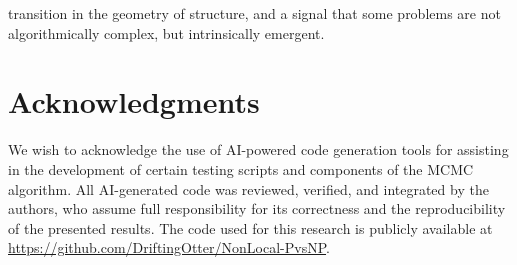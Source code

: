 \documentclass[12pt, letterpaper]{article}
\begin{document}
transition in the geometry of structure, and a signal that some problems are not algorithmically complex, but intrinsically emergent.

\section*{Acknowledgments}
We wish to acknowledge the use of AI-powered code generation tools for assisting in the development of certain testing scripts and components of the MCMC algorithm. All AI-generated code was reviewed, verified, and integrated by the authors, who assume full responsibility for its correctness and the reproducibility of the presented results. The code used for this research is publicly available at \href{https://github.com/DriftingOtter/NonLocal-PvsNP}{https://github.com/DriftingOtter/NonLocal-PvsNP}.

\nocite{*}


\end{document}
